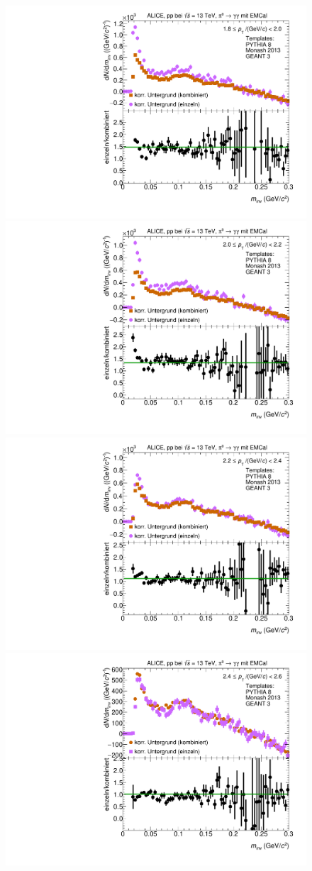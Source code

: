 \begin{figure}[t]
\centering
\begin{multicols}{2}
    \includegraphics[width=.65\linewidth]{Anhang/BackgroundWithRatio03_Data_2016.pdf}\par 
    \includegraphics[width=.65\linewidth]{Anhang/BackgroundWithRatio04_Data_2016.pdf}\par 
\end{multicols}
\begin{multicols}{2}
    \includegraphics[width=.65\linewidth]{Anhang/BackgroundWithRatio05_Data_2016.pdf}\par
    \includegraphics[width=.65\linewidth]{Anhang/BackgroundWithRatio06_Data_2016.pdf}\par

\end{multicols}
\end{figure}
